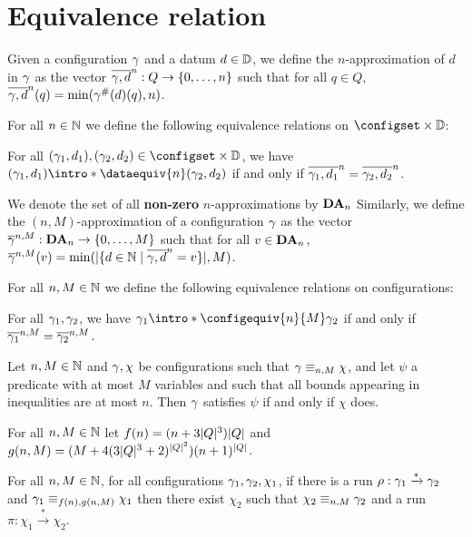 \section{Equivalence relation}
\label{sec:equivalence-relation}

Given a configuration $\config$ and a datum $d \in \Dataset$, we define the $n$-approximation of $d$ in $\config$ as the vector $\dataapprox{n}{\config}{d} : Q \to \nset{0}{n}$ such that for all $q\in Q$, $\dataapprox{n}{\config}{d}(q)=\min(\counting{\config}(d)(q),n)$.

For all $n \in \nats$ we define the following equivalence relations on $\configset \times \Dataset$: 

For all $(\config_1, d_1), (\config_2, d_2) \in \configset\times \Dataset$, we have $(\config_1, d_1) \intro*\dataequiv{n} (\config_2, d_2)$ if and only if $\dataapprox{n}{\config_1}{d_1} = \dataapprox{n}{\config_2}{d_2}$.



We denote the set of all \textbf{non-zero} $n$-approximations by $\DataApproxSet{n}$
Similarly, we define the $(n,M)$-approximation of a configuration $\config$ as the vector $\configapprox{n}{M}{\config} : \DataApproxSet{n} \to \nset{0}{M}$ such that for all $v\in \DataApproxSet{n}$,
$\configapprox{n}{M}{\config}(v) = \min(\size{\set{d \in \nats \mid \dataapprox{n}{\config}{d} = v}},M)$.

For all $n, M \in \nats$ we define the following equivalence relations on configurations: 

For all $\config_1, \config_2$, we have $\config_1 \intro*\configequiv{n}{M} \config_2$ if and only if $\configapprox{n}{M}{\config_1} = \configapprox{n}{M}{\config_2}$.

\begin{lemma}
	Let $n,M \in \nats$ and $\config, \chi$ be configurations such that $\config \equiv_{n,M} \chi$, and let $\psi$ a predicate with at most $M$ variables and such that all bounds appearing in inequalities are at most $n$.
	Then $\config$ satisfies $\psi$ if and only if $\chi$ does.  
\end{lemma}


For all $n, M \in \nats$ let $f(n) = (n+3\size{Q}^3)\size{Q}$ and $g(n,M) = (M+4(3\size{Q}^3+2)^{\size{Q}^2})(n+1)^{\size{Q}}$.

\begin{lemma}
	For all $n, M \in \nats$, for all configurations $\config_1, \config_2, \chi_1$, if there is a run $\run : \config_1 \xrightarrow{*} \config_2$ and $\config_1 \equiv_{f(n),g(n,M)} \chi_1$ then there exist $\chi_2$ such that $\chi_2 \equiv_{n,M} \config_2$ and a run $\pi : \chi_1 \xrightarrow{*} \chi_2$.
\end{lemma}

